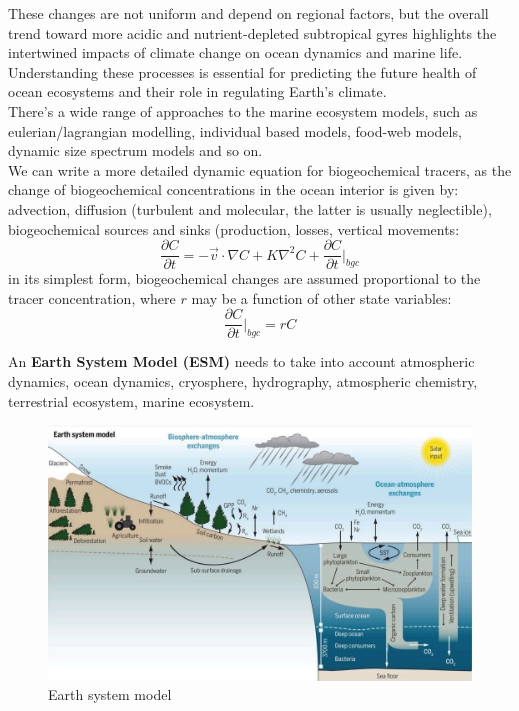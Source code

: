 These changes are not uniform and depend on regional factors, but the overall trend toward more acidic and nutrient-depleted subtropical gyres highlights the intertwined impacts of climate change on ocean dynamics and marine life. Understanding these processes is essential for predicting the future health of ocean ecosystems and their role in regulating Earth’s climate.\\
[0.2cm]

There's a wide range of approaches to the marine ecosystem models, such as eulerian/lagrangian modelling, individual based models, food-web models, dynamic size spectrum models and so on. \\

We can write a more detailed dynamic equation for biogeochemical tracers, as the change of biogeochemical concentrations in the ocean interior is given by: advection, diffusion (turbulent and molecular, the latter is usually neglectible), biogeochemical sources and sinks (production, losses, vertical movements: 
\begin{equation}
    \frac{\partial C}{\partial t}=-\vec{v}\cdot\nabla C+K\nabla^2 C+\frac{\partial C}{\partial t}\big|_{bgc} 
\end{equation}
in its simplest form, biogeochemical changes are assumed proportional to the tracer concentration, where $r$ may be a function of other state variables:
$$\frac{\partial C}{\partial t}\big|_{bgc} =rC$$


An \textbf{Earth System Model (ESM)} needs to take into account atmospheric dynamics, ocean dynamics, cryosphere, hydrography, atmospheric chemistry, terrestrial ecosystem, marine ecosystem. 
\begin{figure}[htpb]
    \centering
    \includegraphics[width=0.5\linewidth]{uploads/Earth system model.png}
    \caption{Earth system model}
   
\end{figure}

